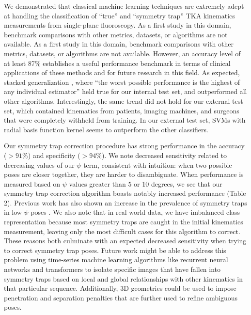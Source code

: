 We demonstrated that classical machine learning techniques are extremely adept at handling the classification of “true” and “symmetry trap” TKA kinematics measurements from single-plane fluoroscopy.
As a first study in this domain, benchmark comparisons with other metrics, datasets, or algorithms are not available.
As a first study in this domain, benchmark comparisons with other metrics, datasets, or algorithms are not available.
However, an accuracy level of at least 87\% establishes a useful performance benchmark in terms of clinical applications of these methods and for future research in this field.
As expected, stacked generalization \cite{wolpertStackedGeneralization1992,smythLinearlyCombiningDensity1999}, where “the worst possible performance is the highest of any individual estimator” held true for our internal test set, and outperformed all other algorithms.
Interestingly, the same trend did not hold for our external test set, which contained kinematics from patients, imaging machines, and surgeons that were completely withheld from training. In our external test set, SVMs with radial basis function kernel seems to outperform the other classifiers.


Our symmetry trap correction procedure has strong performance in the accuracy ($>91\%$) and specificity ($>94\%$).
We note decreased sensitivity related to decreasing values of our $\psi$ term, consistent with intuition: when two possible poses are closer together, they are harder to disambiguate.
When performance is measured based on $\psi$ values greater than 5 or 10 degrees, we see that our symmetry trap correction algorithm boasts notably increased performance (Table 2).
Previous work has also shown an increase in the prevalence of symmetry traps in low-$\psi$ poses \cite{jensenJointTrackMachine2023}.
We also note that in real-world data, we have imbalanced class representation because most symmetry traps are caught in the initial kinematics measurement, leaving only the most difficult cases for this algorithm to correct.
These reasons both culminate with an expected decreased sensitivity when trying to correct symmetry trap poses.
Future work might be able to address this problem using time-series machine learning algorithms like recurrent neural networks \cite{hochreiterLongShortTermMemory1997} and transformers \cite{vaswaniAttentionAllYou2017} to isolate specific images that have fallen into symmetry traps based on local and global relationships with other kinematics in that particular sequence.
Additionally, 3D geometries could be used to impose penetration and separation penalties that are further used to refine ambiguous poses.


